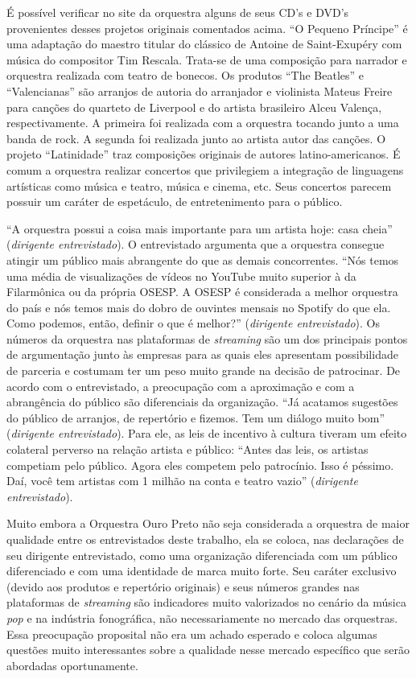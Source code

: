\documentclass[a4paper, 12pt, openright, oneside, german, french, english, brazil]{abntex2}
\begin{document}
	É possível verificar no site da orquestra alguns de seus CD's e DVD's provenientes desses projetos originais comentados acima. ``O Pequeno Príncipe'' é uma adaptação do maestro titular do clássico de Antoine de Saint-Exupéry com música do compositor Tim Rescala. Trata-se de uma composição para narrador e orquestra realizada com teatro de bonecos. Os produtos ``The Beatles'' e ``Valencianas'' são arranjos de autoria do arranjador e violinista Mateus Freire para canções do quarteto de Liverpool e do artista brasileiro Alceu Valença, respectivamente. A primeira foi realizada com a orquestra tocando junto a uma banda de rock. A segunda foi realizada junto ao artista autor das canções. O projeto ``Latinidade'' traz composições originais de autores latino-americanos. É comum a orquestra realizar concertos que privilegiem a integração de linguagens artísticas como música e teatro, música e cinema, etc. Seus concertos parecem possuir um caráter de espetáculo, de entretenimento para o público.

	``A orquestra possui a coisa mais importante para um artista hoje: casa cheia'' (\textit{dirigente entrevistado}). O entrevistado argumenta que a orquestra consegue atingir um público mais abrangente do que as demais concorrentes. ``Nós temos uma média de visualizações de vídeos no YouTube muito superior à da Filarmônica ou da própria OSESP. A OSESP é considerada a melhor orquestra do país e nós temos mais do dobro de ouvintes mensais no Spotify do que ela. Como podemos, então, definir o que é melhor?'' (\textit{dirigente entrevistado}). Os números da orquestra nas plataformas de \textit{streaming} são um dos principais pontos de argumentação junto às empresas para as quais eles apresentam possibilidade de parceria e costumam ter um peso muito grande na decisão de patrocinar. De acordo com o entrevistado, a preocupação com a aproximação e com a abrangência do público são diferenciais da organização. ``Já acatamos sugestões do público de arranjos, de repertório e fizemos. Tem um diálogo muito bom'' (\textit{dirigente entrevistado}). Para ele, as leis de incentivo à cultura tiveram um efeito colateral perverso na relação artista e público: ``Antes das leis, os artistas competiam pelo público. Agora eles competem pelo patrocínio. Isso é péssimo. Daí, você tem artistas com 1 milhão na conta e teatro vazio'' (\textit{dirigente entrevistado}).
	
	Muito embora a Orquestra Ouro Preto não seja considerada a orquestra de maior qualidade entre os entrevistados deste trabalho, ela se coloca, nas declarações de seu dirigente entrevistado, como uma organização diferenciada com um público diferenciado e com uma identidade de marca muito forte. Seu caráter exclusivo (devido aos produtos e repertório originais) e seus números grandes nas plataformas de \textit{streaming} são indicadores muito valorizados no cenário da música \textit{pop} e na indústria fonográfica, não necessariamente no mercado das orquestras. Essa preocupação proposital não era um achado esperado e coloca algumas questões muito interessantes sobre a qualidade nesse mercado específico que serão abordadas oportunamente.
	
\end{document}
